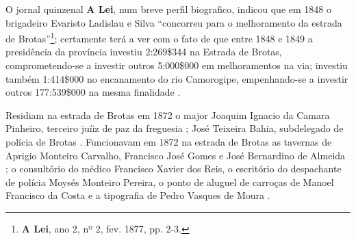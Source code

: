
O jornal quinzenal \textbf{A Lei}, num breve perfil biografico, indicou que em 1848 o brigadeiro Evaristo Ladislau e Silva ``concorreu para o melhoramento da estrada de Brotas''\footnote{\textbf{A Lei}, ano 2, nº 2, fev. 1877, pp. 2-3.}; certamente terá a ver com o fato de que entre 1848 e 1849 a presidência da província investiu 2:269\$344 na Estrada de Brotas, comprometendo-se a investir outros 5:000\$000 em melhoramentos na via; investiu também 1:414\$000 no encanamento do rio Camorogipe, empenhando-se a investir outros 177:539\$000 na mesma finalidade \cite{bahia_rpe_1849}.

Residiam na estrada de Brotas em 1872 o major Joaquim Ignacio da Camara Pinheiro, terceiro juíiz de paz da freguesia \cite[segunda~parte, p.~91]{pimenta_almanak_1872}; José Teixeira Bahia, subdelegado de polícia de Brotas \cite[segunda~parte, pp.~132]{pimenta_almanak_1872}. Funcionavam em 1872 na estrada de Brotas as tavernas de Aprigio Monteiro Carvalho, Francisco José Gomes e José Bernardino de Almeida \cite[terceira~parte, pp.~39, 42, 43]{pimenta_almanak_1872}; o consultório do médico Francisco Xavier dos Reis, o escritório do despachante de polícia Moysés Monteiro Pereira, o ponto de aluguel de carroças de Manoel Francisco da Costa e a tipografia de Pedro Vasques de Moura \cite[quarta~parte, pp.~4, 10, 20, 38]{pimenta_almanak_1872}.

